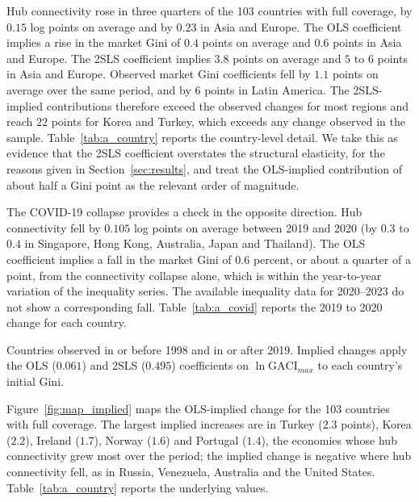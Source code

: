 \documentclass[12pt]{article}
\begin{document}
Hub connectivity rose in three quarters of the 103 countries with full coverage, by $0.15$ log points on average and by $0.23$ in Asia and Europe. The OLS coefficient implies a rise in the market Gini of $0.4$ points on average and $0.6$ points in Asia and Europe. The 2SLS coefficient implies $3.8$ points on average and $5$ to $6$ points in Asia and Europe. Observed market Gini coefficients fell by $1.1$ points on average over the same period, and by $6$ points in Latin America. The 2SLS-implied contributions therefore exceed the observed changes for most regions and reach $22$ points for Korea and Turkey, which exceeds any change observed in the sample. Table~\ref{tab:a_country} reports the country-level detail. We take this as evidence that the 2SLS coefficient overstates the structural elasticity, for the reasons given in Section~\ref{sec:results}, and treat the OLS-implied contribution of about half a Gini point as the relevant order of magnitude.

The COVID-19 collapse provides a check in the opposite direction. Hub connectivity fell by $0.105$ log points on average between 2019 and 2020 (by $0.3$ to $0.4$ in Singapore, Hong Kong, Australia, Japan and Thailand). The OLS coefficient implies a fall in the market Gini of $0.6$ percent, or about a quarter of a point, from the connectivity collapse alone, which is within the year-to-year variation of the inequality series. The available inequality data for 2020--2023 do not show a corresponding fall. Table~\ref{tab:a_covid} reports the 2019 to 2020 change for each country.

\begin{table}[H]\centering\caption{Implied contribution of hub-connectivity growth to the market Gini, first to last observation.}\label{tab:contrib}
\begin{threeparttable}\small
\begin{tablenotes}\footnotesize\item Countries observed in or before 1998 and in or after 2019. Implied changes apply the OLS ($0.061$) and 2SLS ($0.495$) coefficients on $\ln\mathrm{GACI}_{max}$ to each country's initial Gini.\end{tablenotes}\end{threeparttable}\end{table}

Figure~\ref{fig:map_implied} maps the OLS-implied change for the 103 countries with full coverage. The largest implied increases are in Turkey ($2.3$ points), Korea ($2.2$), Ireland ($1.7$), Norway ($1.6$) and Portugal ($1.4$), the economies whose hub connectivity grew most over the period; the implied change is negative where hub connectivity fell, as in Russia, Venezuela, Australia and the United States. Table~\ref{tab:a_country} reports the underlying values.
\end{document}
